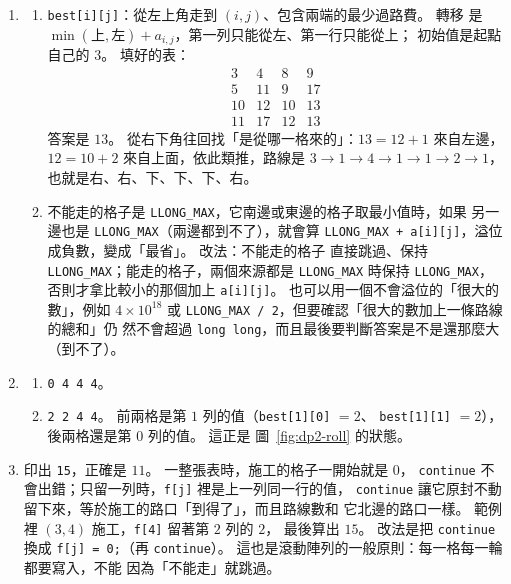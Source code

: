 \begin{enumerate}
\item
\begin{enumerate}
\item \texttt{best[i][j]}：從左上角走到 $(i, j)$、包含兩端的最少過路費。 轉移
是 $\min(\text{上}, \text{左}) + a_{i,j}$，第一列只能從左、第一行只能從上；
初始值是起點自己的 $3$。 填好的表：
\[
\begin{matrix}
3 & 4 & 8 & 9 \\
5 & 11 & 9 & 17 \\
10 & 12 & 10 & 13 \\
11 & 17 & 12 & 13
\end{matrix}
\]
答案是 $13$。 從右下角往回找「是從哪一格來的」：$13 = 12 + 1$ 來自左邊，
$12 = 10 + 2$ 來自上面，依此類推，路線是
$3 \to 1 \to 4 \to 1 \to 1 \to 2 \to 1$，也就是右、右、下、下、下、右。
\item 不能走的格子是 \texttt{LLONG\_MAX}，它南邊或東邊的格子取最小值時，如果
另一邊也是 \texttt{LLONG\_MAX}（兩邊都到不了），就會算
\texttt{LLONG\_MAX + a[i][j]}，溢位成負數，變成「最省」。 改法：不能走的格子
直接跳過、保持 \texttt{LLONG\_MAX}；能走的格子，兩個來源都是
\texttt{LLONG\_MAX} 時保持 \texttt{LLONG\_MAX}，否則才拿比較小的那個加上
\texttt{a[i][j]}。 也可以用一個不會溢位的「很大的數」，例如 $4 \times
10^{18}$ 或 \texttt{LLONG\_MAX / 2}，但要確認「很大的數加上一條路線的總和」仍
然不會超過 \texttt{long long}，而且最後要判斷答案是不是還那麼大（到不了）。
\end{enumerate}

\item
\begin{enumerate}
\item \texttt{0 4 4 4}。
\item \texttt{2 2 4 4}。 前兩格是第 $1$ 列的值（\texttt{best[1][0]} $= 2$、
\texttt{best[1][1]} $= 2$），後兩格還是第 $0$ 列的值。 這正是
圖~\ref{fig:dp2-roll} 的狀態。
\end{enumerate}

\item 印出 \texttt{15}，正確是 $11$。 一整張表時，施工的格子一開始就是 $0$，
\texttt{continue} 不會出錯；只留一列時，\texttt{f[j]} 裡是上一列同一行的值，
\texttt{continue} 讓它原封不動留下來，等於施工的路口「到得了」，而且路線數和
它北邊的路口一樣。 範例裡 $(3, 4)$ 施工，\texttt{f[4]} 留著第 $2$ 列的 $2$，
最後算出 $15$。 改法是把 \texttt{continue} 換成 \texttt{f[j] = 0;}（再
\texttt{continue}）。 這也是滾動陣列的一般原則：每一格每一輪都要寫入，不能
因為「不能走」就跳過。


\end{enumerate}
